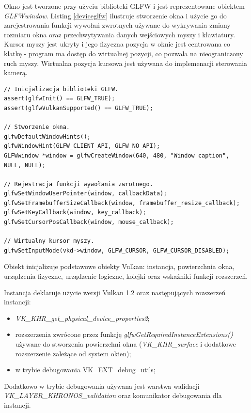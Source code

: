 Okno jest tworzone przy użyciu biblioteki GLFW i jest reprezentowane obiektem \textit{GLFWwindow}.
Listing \ref{deviceglfw} ilustruje stworzenie okna i użycie go do zarejestrowania funkcji wywołań zwrotnych używane do wykrywania zmiany rozmiaru okna oraz przechwytywania danych wejściowych myszy i klawiatury.
Kursor myszy jest ukryty i jego fizyczna pozycja w oknie jest
centrowana co klatkę - program ma dostęp do wirtualnej pozycji, co pozwala na nieograniczony ruch myszy.
Wirtualna pozycja kursowa jest używana do implemenacji sterowania kamerą.
\lstset{language=C}
\begin{lstlisting}[caption={Użycie biblioteki GLFW do stworzenia okna i rejestracji funkcji wywołań zwrotnich},captionpos=b,label={deviceglfw}]
// Inicjalizacja biblioteki GLFW.
assert(glfwInit() == GLFW_TRUE);
assert(glfwVulkanSupported() == GLFW_TRUE);

// Stworzenie okna.
glfwDefaultWindowHints();
glfwWindowHint(GLFW_CLIENT_API, GLFW_NO_API);
GLFWwindow *window = glfwCreateWindow(640, 480, "Window caption", NULL, NULL);

// Rejestracja funkcji wywołania zwrotnego.
glfwSetWindowUserPointer(window, callbackData);
glfwSetFramebufferSizeCallback(window, framebuffer_resize_callback);
glfwSetKeyCallback(window, key_callback);
glfwSetCursorPosCallback(window, mouse_callback);

// Wirtualny kursor myszy.
glfwSetInputMode(vkd->window, GLFW_CURSOR, GLFW_CURSOR_DISABLED);
\end{lstlisting}

Obiekt inicjalizuje podstawowe obiekty Vulkan: instancja, powierzchnia okna, urządzenia fizyczne, urządzenie logiczne, kolejki oraz wskaźniki funkcji rozszerzeń.

Instancja deklaruje użycie wersji Vulkan 1.2 oraz następujących rozszerzeń instancji:
\begin{itemize}
	\item \textit{VK\_KHR\_get\_physical\_device\_properties2};
	\item rozszerzenia zwrócone przez funkcję \textit{glfwGetRequiredInstanceExtensions()} używane do stworzenia powierzchni okna (\textit{VK\_KHR\_surface} i dodatkowe rozszerzenie zależące od system okien);
	\item w trybie debugowania VK\_EXT\_debug\_utils;
\end{itemize}
Dodatkowo w trybie debugowania używana jest warstwa walidacji \textit{VK\_LAYER\_KHRONOS\_validation} oraz komunikator debugowania dla instancji.

